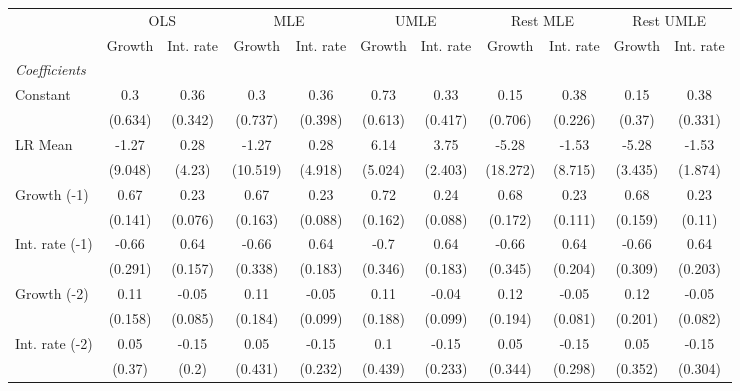 \begin{table}[htbp] 
	\centering
	\begin{tabular}{@{\extracolsep{4pt}}lcccccccccc@{}}		\hline\hline
		 		 & \multicolumn{2}{c}{OLS} &\multicolumn{2}{c}{MLE} &\multicolumn{2}{c}{UMLE} &\multicolumn{2}{c}{Rest MLE} &\multicolumn{2}{c}{Rest UMLE} \\ 
 		 & Growth 	 & Int. rate 	 & Growth 	 & Int. rate 	 & Growth 	 & Int. rate 	 & Growth 	 & Int. rate 	 & Growth 	 & Int. rate\\\cline{2-3}\cline{4-5}\cline{6-7}\cline{8-9}\cline{10-11}
\rule{0pt}{4ex} 
 \emph{Coefficients} 	  		 & 		 & 		 & 		 & 		 & 		 & 		 & 		 & 		 & 		 &\\ 
\quad Constant 	 & 0.3 	 & 0.36 	 & 0.3 	 & 0.36 	 & 0.73 	 & 0.33 	 & 0.15 	 & 0.38 	 & 0.15 	 & 0.38	 \\ 
 		 & (0.634) 	 & (0.342) 	 & (0.737) 	 & (0.398) 	 & (0.613) 	 & (0.417) 	 & (0.706) 	 & (0.226) 	 & (0.37) 	 & (0.331) 	 \\ 
\quad LR Mean 	 & -1.27 	 & 0.28 	 & -1.27 	 & 0.28 	 & 6.14 	 & 3.75 	 & -5.28 	 & -1.53 	 & -5.28 	 & -1.53	 \\ 
 		 & (9.048) 	 & (4.23) 	 & (10.519) 	 & (4.918) 	 & (5.024) 	 & (2.403) 	 & (18.272) 	 & (8.715) 	 & (3.435) 	 & (1.874) 	 \\ 
\quad Growth (-1) 	 &0.67 	 & 0.23 	 & 0.67 	 & 0.23 	 & 0.72 	 & 0.24 	 & 0.68 	 & 0.23 	 & 0.68 	 & 0.23	 \\ 
 		 & (0.141) 	 & (0.076) 	 & (0.163) 	 & (0.088) 	 & (0.162) 	 & (0.088) 	 & (0.172) 	 & (0.111) 	 & (0.159) 	 & (0.11) 	 \\ 
\quad Int. rate (-1) 	 &-0.66 	 & 0.64 	 & -0.66 	 & 0.64 	 & -0.7 	 & 0.64 	 & -0.66 	 & 0.64 	 & -0.66 	 & 0.64	 \\ 
 		 & (0.291) 	 & (0.157) 	 & (0.338) 	 & (0.183) 	 & (0.346) 	 & (0.183) 	 & (0.345) 	 & (0.204) 	 & (0.309) 	 & (0.203) 	 \\ 
\quad Growth (-2) 	 &0.11 	 & -0.05 	 & 0.11 	 & -0.05 	 & 0.11 	 & -0.04 	 & 0.12 	 & -0.05 	 & 0.12 	 & -0.05	 \\ 
 		 & (0.158) 	 & (0.085) 	 & (0.184) 	 & (0.099) 	 & (0.188) 	 & (0.099) 	 & (0.194) 	 & (0.081) 	 & (0.201) 	 & (0.082) 	 \\ 
\quad Int. rate (-2) 	 &0.05 	 & -0.15 	 & 0.05 	 & -0.15 	 & 0.1 	 & -0.15 	 & 0.05 	 & -0.15 	 & 0.05 	 & -0.15	 \\ 
 		 & (0.37) 	 & (0.2) 	 & (0.431) 	 & (0.232) 	 & (0.439) 	 & (0.233) 	 & (0.344) 	 & (0.298) 	 & (0.352) 	 & (0.304) 	 \\ 

\end{tabular}
\end{table}
